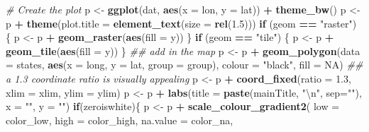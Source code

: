 \documentclass[]{book}
\newenvironment{Shaded}{\begin{snugshade}}{\end{snugshade}}
\newcommand{\CharTok}[1]{\textcolor[rgb]{0.31,0.60,0.02}{#1}}
\newcommand{\CommentTok}[1]{\textcolor[rgb]{0.56,0.35,0.01}{\textit{#1}}}
\newcommand{\ControlFlowTok}[1]{\textcolor[rgb]{0.13,0.29,0.53}{\textbf{#1}}}
\newcommand{\DataTypeTok}[1]{\textcolor[rgb]{0.13,0.29,0.53}{#1}}
\newcommand{\FloatTok}[1]{\textcolor[rgb]{0.00,0.00,0.81}{#1}}
\newcommand{\KeywordTok}[1]{\textcolor[rgb]{0.13,0.29,0.53}{\textbf{#1}}}
\newcommand{\NormalTok}[1]{#1}
\newcommand{\OperatorTok}[1]{\textcolor[rgb]{0.81,0.36,0.00}{\textbf{#1}}}
\newcommand{\OtherTok}[1]{\textcolor[rgb]{0.56,0.35,0.01}{#1}}
\newcommand{\StringTok}[1]{\textcolor[rgb]{0.31,0.60,0.02}{#1}}
\begin{document}
\begin{Shaded}
\begin{Highlighting}[]
{    \CommentTok{# Create the plot}
\NormalTok{    p <-}\StringTok{ }\KeywordTok{ggplot}\NormalTok{(dat, }\KeywordTok{aes}\NormalTok{(}\DataTypeTok{x =}\NormalTok{ lon, }\DataTypeTok{y =}\NormalTok{ lat)) }\OperatorTok{+}
\StringTok{        }\KeywordTok{theme_bw}\NormalTok{()}
\NormalTok{    p <-}\StringTok{ }\NormalTok{p }\OperatorTok{+}\StringTok{ }\KeywordTok{theme}\NormalTok{(}\DataTypeTok{plot.title =} \KeywordTok{element_text}\NormalTok{(}\DataTypeTok{size =} \KeywordTok{rel}\NormalTok{(}\FloatTok{1.5}\NormalTok{)))}
    \ControlFlowTok{if}\NormalTok{ (geom }\OperatorTok{==}\StringTok{ "raster"}\NormalTok{) \{}
\NormalTok{        p <-}\StringTok{ }\NormalTok{p }\OperatorTok{+}\StringTok{ }\KeywordTok{geom_raster}\NormalTok{(}\KeywordTok{aes}\NormalTok{(}\DataTypeTok{fill =}\NormalTok{ y))}
\NormalTok{    \}}
    \ControlFlowTok{if}\NormalTok{ (geom }\OperatorTok{==}\StringTok{ "tile"}\NormalTok{) \{}
\NormalTok{        p <-}\StringTok{ }\NormalTok{p }\OperatorTok{+}\StringTok{ }\KeywordTok{geom_tile}\NormalTok{(}\KeywordTok{aes}\NormalTok{(}\DataTypeTok{fill =}\NormalTok{ y))}
\NormalTok{    \}}
    \CommentTok{## add in the map}
\NormalTok{    p <-}\StringTok{ }\NormalTok{p }\OperatorTok{+}\StringTok{ }\KeywordTok{geom_polygon}\NormalTok{(}\DataTypeTok{data =}\NormalTok{ states, }\KeywordTok{aes}\NormalTok{(}\DataTypeTok{x =}\NormalTok{ long, }\DataTypeTok{y =}\NormalTok{ lat, }\DataTypeTok{group =}\NormalTok{ group), }
                          \DataTypeTok{colour =} \StringTok{"black"}\NormalTok{, }\DataTypeTok{fill =} \OtherTok{NA}\NormalTok{) }
    \CommentTok{## a 1.3 coordinate ratio is visually appealing}
\NormalTok{    p <-}\StringTok{ }\NormalTok{p }\OperatorTok{+}\StringTok{ }\KeywordTok{coord_fixed}\NormalTok{(}\DataTypeTok{ratio =} \FloatTok{1.3}\NormalTok{, }\DataTypeTok{xlim =}\NormalTok{ xlim, }\DataTypeTok{ylim =}\NormalTok{ ylim)}
\NormalTok{    p <-}\StringTok{ }\NormalTok{p }\OperatorTok{+}\StringTok{ }\KeywordTok{labs}\NormalTok{(}\DataTypeTok{title =} \KeywordTok{paste}\NormalTok{(mainTitle, }\StringTok{"}\CharTok{\textbackslash{}n}\StringTok{"}\NormalTok{, }\DataTypeTok{sep=}\StringTok{""}\NormalTok{), }\DataTypeTok{x =} \StringTok{""}\NormalTok{, }\DataTypeTok{y =} \StringTok{""}\NormalTok{)}
    \ControlFlowTok{if}\NormalTok{(zeroiswhite)\{}
\NormalTok{        p <-}\StringTok{ }\NormalTok{p }\OperatorTok{+}\StringTok{ }\KeywordTok{scale_colour_gradient2}\NormalTok{(}
            \DataTypeTok{low      =}\NormalTok{  color_low, }
            \DataTypeTok{high     =}\NormalTok{ color_high,}
            \DataTypeTok{na.value =}\NormalTok{ color_na,}
}
\end{Highlighting}
\end{Shaded}
\end{document}
